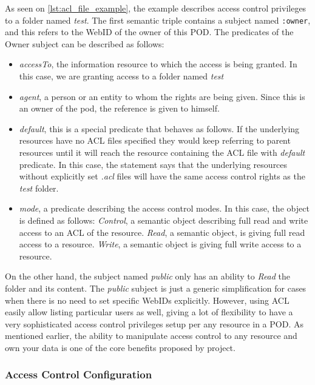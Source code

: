 As seen on \autoref{lst:acl_file_example}, the example describes access control privileges to a folder named \textit{test}. The first semantic triple contains a subject named \texttt{:owner}, and this refers to the WebID of the owner of this \solid{} POD. The predicates of the Owner subject can be described as follows:
\begin{itemize}
    \item \textit{accessTo}, the information resource to which the access is being granted. In this case, we are granting access to a folder named \textit{test}
    \item \textit{agent}, a person or an entity to whom the rights are being given. Since this is an owner of the \solid{} pod, the reference is given to himself.
    \item \textit{default}, this is a special predicate that behaves as follows. If the underlying resources have no ACL files specified they would keep referring to parent resources until it will reach the resource containing the ACL file with \textit{default} predicate. In this case, the statement says that the underlying resources without explicitly set \textit{.acl} files will have the same access control rights as the \textit{test} folder.
    \item \textit{mode}, a predicate describing the access control modes. In this case, the object is defined as follows: 
        \subitem \textit{Control}, a semantic object describing full read and write access to an ACL of the resource.
        \subitem \textit{Read}, a semantic object, is giving full read access to a resource.
        \subitem \textit{Write}, a semantic object is giving full write access to a resource.
\end{itemize}

On the other hand, the subject named \textit{public} only has an ability to \textit{Read} the folder and its content. The \textit{public} subject is just a generic simplification for cases when there is no need to set specific WebIDs explicitly. However, using ACL easily allow listing particular users as well, giving a lot of flexibility to have a very sophisticated access control privileges setup per any resource in a \solid{} POD. As mentioned earlier, the ability to manipulate access control to any resource and own your data is one of the core benefits proposed by \solid{} project. 

\subsubsection{Access Control Configuration}

